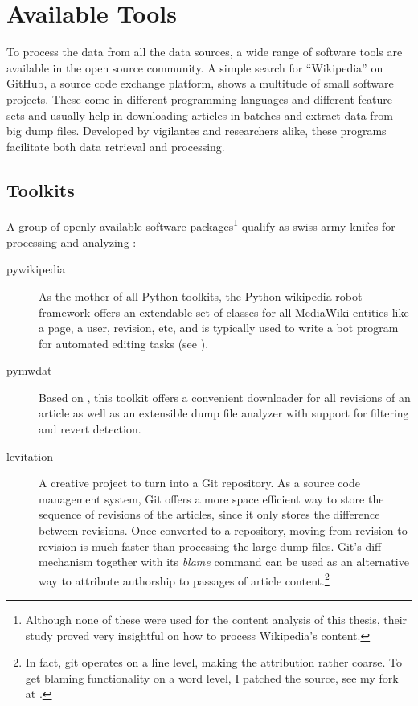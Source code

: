 \section{Available Tools}

To process the data from all the data sources, a wide range of software tools are available in the open source community.
A simple search for ``Wikipedia'' on GitHub, a source code exchange platform, shows a multitude of small software projects.
These come in different programming languages and different feature sets and usually help in downloading articles in batches and extract data from big dump files. 
Developed by vigilantes and researchers alike, these programs facilitate both data retrieval and processing.

\subsection{Toolkits}\label{sub:toolkits}

A group of openly available software packages\footnote{Although none of these were used for the content analysis of this thesis, their study proved very insightful on how to process Wikipedia's content.} qualify as swiss-army knifes for processing and analyzing :

\begin{description}
\item[pywikipedia] As the mother of all Python toolkits, the Python wikipedia robot framework offers an extendable set of classes for all MediaWiki entities like a page, a user, revision, etc, and is typically used to write a bot program for automated editing tasks (see ).
\item[pymwdat] Based on , this toolkit offers a convenient downloader for all revisions of an article as well as an extensible dump file analyzer with support for filtering and revert detection.
\item[levitation] A creative project to turn  into a Git repository.
As a source code management system, Git offers a more space efficient way to store the sequence of revisions of the articles, since it only stores the difference between revisions.
Once converted to a repository, moving from revision to revision is much faster than processing the large dump files.
Git's diff mechanism together with its \emph{blame} command can be used as an alternative way to attribute authorship to passages of article content.\footnote{In fact, git operates on a line level, making the attribution rather coarse. To get blaming functionality on a word level, I patched the source, see my fork at .}
\end{description}

